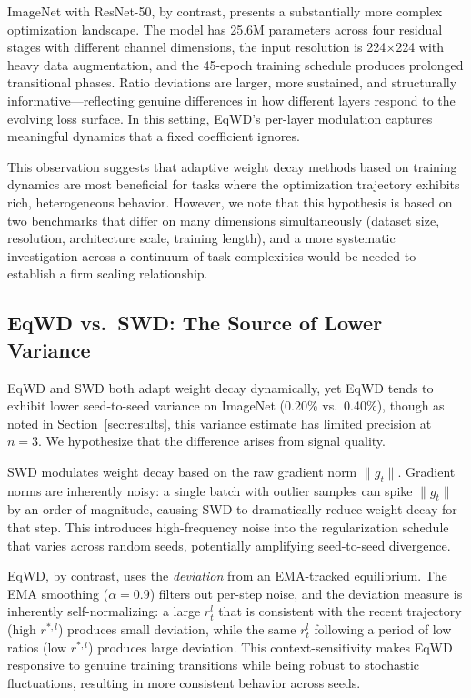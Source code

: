 \documentclass{article}
\begin{document}
ImageNet with ResNet-50, by contrast, presents a substantially more
complex optimization landscape. The model has 25.6M parameters across
four residual stages with different channel dimensions, the input
resolution is 224$\times$224 with heavy data augmentation, and the
45-epoch training schedule produces prolonged transitional phases. Ratio
deviations are larger, more sustained, and structurally
informative---reflecting genuine differences in how different layers
respond to the evolving loss surface. In this setting, EqWD's per-layer
modulation captures meaningful dynamics that a fixed coefficient
ignores.

This observation suggests that adaptive weight decay methods based on
training dynamics are most beneficial for tasks where the optimization
trajectory exhibits rich, heterogeneous behavior. However, we note that
this hypothesis is based on two benchmarks that differ on many
dimensions simultaneously (dataset size, resolution, architecture scale,
training length), and a more systematic investigation across a continuum
of task complexities would be needed to establish a firm scaling
relationship.

\subsection{EqWD vs.\ SWD: The Source of Lower Variance}
\label{sec:variance}

EqWD and SWD both adapt weight decay dynamically, yet EqWD tends to
exhibit lower seed-to-seed variance on ImageNet (0.20\% vs.~0.40\%),
though as noted in Section~\ref{sec:results}, this variance estimate has limited
precision at $n = 3$. We hypothesize that the difference arises from
signal quality.

SWD modulates weight decay based on the raw gradient norm $\|g_t\|$.
Gradient norms are inherently noisy: a single batch with outlier samples
can spike $\|g_t\|$ by an order of magnitude, causing SWD to
dramatically reduce weight decay for that step. This introduces
high-frequency noise into the regularization schedule that varies across
random seeds, potentially amplifying seed-to-seed divergence.

EqWD, by contrast, uses the \emph{deviation} from an EMA-tracked
equilibrium. The EMA smoothing ($\alpha = 0.9$) filters out per-step
noise, and the deviation measure is inherently self-normalizing: a large
$r_t^l$ that is consistent with the recent trajectory (high
$r^{*,l}$) produces small deviation, while the same $r_t^l$
following a period of low ratios (low $r^{*,l}$) produces large
deviation. This context-sensitivity makes EqWD responsive to genuine
training transitions while being robust to stochastic fluctuations,
resulting in more consistent behavior across seeds.
\end{document}
